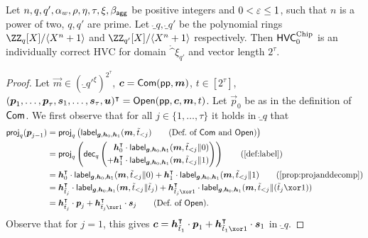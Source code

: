 \begin{lemma}\label{lem:veccomcorrectness}
  Let $n,q,q',\alpha_w,\rho,\eta,\tau,\xi,\beta_{\mathsf{agg}}$ be positive integers and $0 < \varepsilon \leq 1$, such that $n$ is a power of two, $q,q'$ are prime.
  Let $\ring_q,\ring_{q'}$ be the polynomial rings $\defringq$ and $\defringqq$ respectively.
  Then $\mathsf{HVC}^{\textup{Chip}}_{0}$ is an individually correct HVC for domain $\ring^\xi_{q'}$ and vector length $2^\tau$.
\end{lemma}
\begin{proof}
Let $\vec{m} \in (\ring_{q'}^{\xi})^{2^\tau}$, $\boldsymbol{c} = \mathsf{Com}(\mathsf{pp},\boldsymbol{m})$, $t\in[2^\tau]$, $(\boldsymbol{p}_1,\dots,\boldsymbol{p}_{\tau},\boldsymbol{s}_1, \dots, \boldsymbol{s}_{\tau},\boldsymbol{u})^\intercal = \mathsf{Open}(\mathsf{pp},\boldsymbol{c},\boldsymbol{m},t)$. Let $\vec{p}_{0}$ be as in the definition of $\mathsf{Com}$.
We first observe that for all $j\in\{1,\ldots,\tau\}$ it holds in $\ring_q$ that
\begin{align*}
  \projmod{q}(\vec{p}_{j-1})
  ={}&\projmod{q}\left(\lbl_{\vec{g},\vec{h}_0,\vec{h}_1}(\vec{m},\tilde t_{< j})\tag{Def.\ of $\commit$ and $\open$}\right)\\
  ={}&\projmod{q}\left(\decompmod{q}\left(
      \begin{aligned}
        &\vec{h}_0^\transpose \cdot\lbl_{\vec{g},\vec{h}_0,\vec{h}_1}(\vec{m},\tilde t_{< j}\Vert 0)\\
        +& \vec{h}_1^\transpose \cdot\lbl_{\vec{g},\vec{h}_0,\vec{h}_1}(\vec{m},\tilde t_{< j}\Vert 1)
      \end{aligned}
    \right)\right)\tag{\autoref{def:label}}\\
  ={}&\vec{h}_0^\transpose \cdot\lbl_{\vec{g},\vec{h}_0,\vec{h}_1}(\vec{m},\tilde t_{< j}\Vert 0) + \vec{h}_1^\transpose \cdot\lbl_{\vec{g},\vec{h}_0,\vec{h}_1}(\vec{m},\tilde t_{< j}\Vert 1)\tag{\autoref{prop:projanddecomp}}\\
  ={}&\vec{h}_{\tilde t_{j}}^\transpose \cdot\lbl_{\vec{g},\vec{h}_0,\vec{h}_1}(\vec{m},\tilde t_{< j}\Vert \tilde t_{j}) + \vec{h}_{\tilde t_{j}\xor 1}^\transpose \cdot\lbl_{\vec{g},\vec{h}_0,\vec{h}_1}(\vec{m},\tilde t_{< j}\Vert (\tilde t_{j}\xor 1))\\
  ={}&\vec{h}_{\tilde t_{j}}^\transpose \cdot\vec{p}_{j} + \vec{h}_{\tilde t_{j}\xor 1}^\transpose \cdot\vec{s}_{j}\tag{Def.\ of $\open$}.
\end{align*}
Observe that for $j=1$, this gives $\vec{c} = \vec{h}_{\tilde t_1}^\transpose\cdot \vec{p}_{1} + \vec{h}_{\tilde t_1 \xor 1}^\transpose \cdot \vec{s}_{1}$ in $\ring_q$.

\end{proof}
